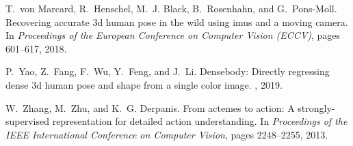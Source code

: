 \documentclass[10pt,twocolumn,letterpaper]{article}
\begin{document}
\begin{thebibliography}{10}
T.~von Marcard, R.~Henschel, M.~J. Black, B.~Rosenhahn, and G.~Pons-Moll.
\newblock Recovering accurate 3d human pose in the wild using imus and a moving
  camera.
\newblock In {\em Proceedings of the European Conference on Computer Vision
  (ECCV)}, pages 601--617, 2018.

P.~Yao, Z.~Fang, F.~Wu, Y.~Feng, and J.~Li.
\newblock Densebody: Directly regressing dense 3d human pose and shape from a
  single color image.
, 2019.

W.~Zhang, M.~Zhu, and K.~G. Derpanis.
\newblock From actemes to action: A strongly-supervised representation for
  detailed action understanding.
\newblock In {\em Proceedings of the IEEE International Conference on Computer
  Vision}, pages 2248--2255, 2013.

\end{thebibliography}
 
\end{document}

